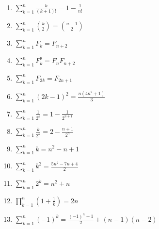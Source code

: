 \documentclass[11pt,a4paper]{article}
\begin{document}
\begin{enumerate}
\item $\displaystyle \sum_{k=1}^{n} \frac{k}{\left(k + 1\right)!} = 1 - \frac{1}{n!}$
\item $\displaystyle \sum_{k=1}^{n} \binom{k}{2} = \binom{n + 1}{2}$
\item $\displaystyle \sum_{k=1}^{n} F_{k} = F_{n + 2}$
\item $\displaystyle \sum_{k=1}^{n} F_{k}^{2} = F_{n}F_{n + 2}$
\item $\displaystyle \sum_{k=1}^{n} F_{2k} = F_{2n + 1}$
\item $\displaystyle \sum_{k=1}^{n} \left(2k - 1\right)^{2} = \frac{n\left(4n^{2} + 1\right)}{3}$
\item $\displaystyle \sum_{k=1}^{n} \frac{1}{2^{k}} = 1 - \frac{1}{2^{n + 1}}$
\item $\displaystyle \sum_{k=1}^{n} \frac{k}{2^{k}} = 2 - \frac{n + 1}{2^{n}}$
\item $\displaystyle \sum_{k=1}^{n} k = n^{2} - n + 1$
\item $\displaystyle \sum_{k=1}^{n} k^{2} = \frac{5n^{2} - 7n + 4}{2}$
\item $\displaystyle \sum_{k=1}^{n} 2^{k} = n^{2} + n$
\item $\displaystyle \prod_{k=1}^{n} \left(1 + \frac{1}{k}\right) = 2n$
\item $\displaystyle \sum_{k=1}^{n} \left(-1\right)^{k} = \frac{\left(-1\right)^{n} - 1}{2} + \left(n - 1\right)\left(n - 2\right)$
\end{enumerate}
\end{document}
